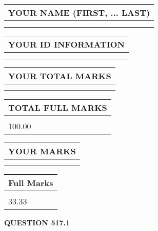 \documentclass{ctexart}
\begin{document}
   
   
   
\newpage 
\setcounter{page}{ 
   517001 } 
   
   
   
   
\noindent\begin{tabular}{|l|}
\hline
YOUR NAME (FIRST, ... LAST)  \\
\hline
 \\ 
 \\ 
\hline
\end{tabular}
\hspace{0.05in} \begin{tabular}{|l|}
\hline
 YOUR   ID   INFORMATION  \\
\hline
 \\ 
 \\ 
\hline
\end{tabular}
   
   
\vspace{0.2in}\noindent\begin{tabular}{|l|}
\hline
YOUR TOTAL MARKS  \\
\hline
 \\ 
 \\ 
\hline
\end{tabular}
\hspace{0.05in} \begin{tabular}{|l|}
\hline
TOTAL FULL MARKS  \\
\hline
 \\ 
100.00 \\
\hline
\end{tabular}
   
   
 \vspace{0.2in}
 
 
 
 
   
   
  
\vspace{0.2in}
  
\noindent\begin{tabular}{|l|}
\hline
 YOUR MARKS  \\
\hline
 \\ 
 \\ 
\hline
\end{tabular}
\hspace{0.05in} \begin{tabular}{|l|}
\hline
 Full Marks  \\
\hline
 \\ 
33.33 \\
\hline
\end{tabular}
{\textbf{\Large{QUESTION
517.1 
}}}
  
\end{document}
